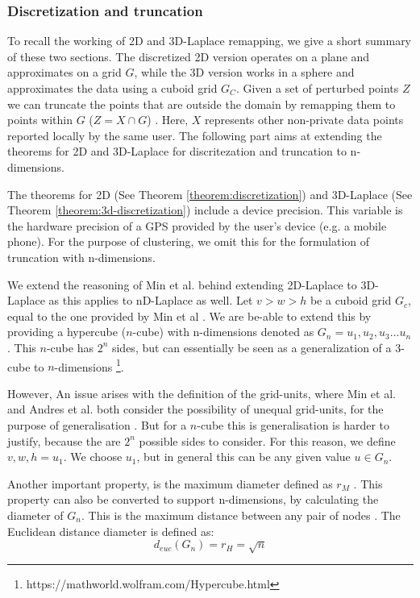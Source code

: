 \subsubsection{Discretization and truncation} \label{theory:nd-laplace-truncation}
To recall the working of 2D and 3D-Laplace remapping, we give a short summary of these two sections. The discretized 2D version operates on a plane and approximates on a grid $G$, while the 3D version works in a sphere and approximates the data using a cuboid grid  $G_C$.
Given a set of perturbed points $Z$ we can truncate the points that are outside the domain by remapping them to points within $G$ ($Z = X \cap G$) \citep{DBLP:journals/corr/abs-1212-1984}.
Here, $X$ represents other non-private data points reported locally by the same user.
The following part aims at extending the theorems for 2D and 3D-Laplace for discritezation and truncation to n-dimensions. \newline

The theorems for 2D (See Theorem \ref{theorem:discretization}) and 3D-Laplace (See Theorem \ref{theorem:3d-discretization}) include a device precision. 
This variable is the hardware precision of a GPS provided by the user's device (e.g. a mobile phone). 
For the purpose of clustering, we omit this for the formulation of truncation with n-dimensions.

We extend the reasoning of Min et al. behind extending 2D-Laplace to 3D-Laplace as this applies to nD-Laplace as well.
Let $v > w > h$ be a cuboid grid $G_c$, equal to the one provided by Min et al \citep{9646489}.
We are be-able to extend this by providing a hypercube ($n$-cube) with n-dimensions denoted as $G_n = u_1, u_2, u_3 ... u_n$. This $n$-cube has $2^n$ sides, but can essentially be seen as a generalization of a 3-cube to $n$-dimensions \footnote{https://mathworld.wolfram.com/Hypercube.html}.

However, An issue arises with the definition of the grid-units, where Min et al. and Andres et al. both consider the possibility of unequal grid-units, for the purpose of generalisation \citep{9646489, DBLP:journals/corr/abs-1212-1984}. 
But for a $n$-cube this is generalisation is harder to justify, because the are $2^n$ possible sides to consider.
For this reason, we define $v, w, h = u_1$. We choose $u_1$, but in general this can be any given value $u \in G_n$.

Another important property, is the maximum diameter defined as $r_M$ \citep{9646489}.
This property can also be converted to support n-dimensions, by calculating the diameter of $G_n$.
This is the maximum distance between any pair of nodes \citep{HARARY1988277}. \newline
The Euclidean distance diameter is defined as:
\begin{equation}
  d_{euc}(G_n) = r_H = \sqrt{n}
\end{equation}

